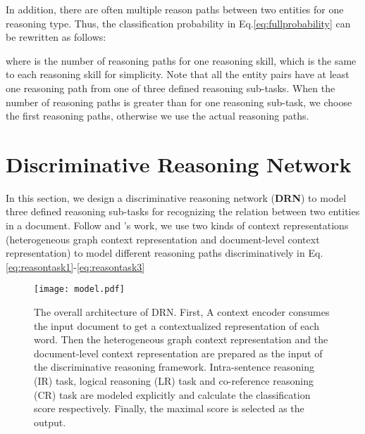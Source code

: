 \documentclass[11pt,a4paper]{article}
\begin{document}
In addition, there are often multiple reason paths between two entities for one reasoning type.
Thus, the classification probability in Eq.\eqref{eq:fullprobability} can be rewritten as follows:

where  is the number of reasoning paths for one reasoning skill, which is the same to each reasoning skill for simplicity.
Note that all the entity pairs have at least one reasoning path from one of three defined reasoning sub-tasks.
When the number of reasoning paths is greater than  for one reasoning sub-task, we choose the  first reasoning paths, otherwise we use the actual reasoning paths.

\section{Discriminative Reasoning Network}
\label{sec3}
In this section, we design a discriminative reasoning network (\textbf{DRN}) to model three defined reasoning sub-tasks for recognizing the relation between two entities in a document.
Follow \citeauthor{zeng-etal-2020-double} and \citeauthor{zhou2021atlop}'s work, we use two kinds of context representations (heterogeneous graph context representation and document-level context representation) to model different reasoning paths discriminatively in Eq.\eqref{eq:reasontask1}-\eqref{eq:reasontask3}
\begin{figure*}[t]
  \centering
  \texttt{[image: model.pdf]}
  \caption{The overall architecture of DRN. First, A context encoder consumes the input document to get a contextualized representation of each word. Then the heterogeneous graph context representation and the document-level context representation are prepared as the input of the discriminative reasoning framework. Intra-sentence reasoning (IR) task, logical reasoning (LR) task and co-reference reasoning (CR) task are modeled explicitly and calculate the classification score respectively. Finally, the maximal score is selected as the output.}
  \label{fig:model}
\end{figure*}
\end{document}
